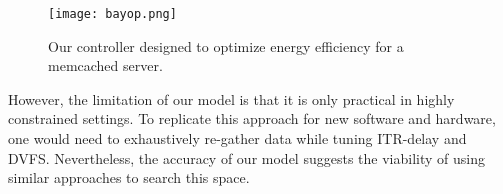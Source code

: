 \begin{figure*}[htb!]
\centering
\texttt{[image: bayop.png]}
\caption[]
{\small Our controller designed to optimize energy efficiency for a memcached server.}
\label{fig:bayop}
\vspace{-0.15in}
\end{figure*}

However, the limitation of our model is that it is only practical in highly constrained settings. To replicate this approach for new software and hardware, one would need to exhaustively re-gather data while tuning ITR-delay and DVFS. Nevertheless, the accuracy of our model suggests the viability of using similar approaches to search this space.
